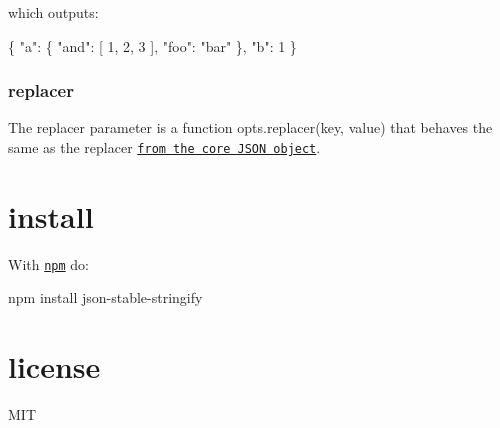 which outputs\+:


\begin{DoxyCode}
\{
  "a": \{
    "and": [
      1,
      2,
      3
    ],
    "foo": "bar"
  \},
  "b": 1
\}
\end{DoxyCode}


\subsubsection*{replacer}

The replacer parameter is a function {\ttfamily opts.\+replacer(key, value)} that behaves the same as the replacer \href{https://developer.mozilla.org/en-US/docs/Web/JavaScript/Guide/Using_native_JSON#The_replacer_parameter}{\tt from the core J\+S\+ON object}.

\section*{install}

With \href{https://npmjs.org}{\tt npm} do\+:


\begin{DoxyCode}
npm install json-stable-stringify
\end{DoxyCode}


\section*{license}

M\+IT 